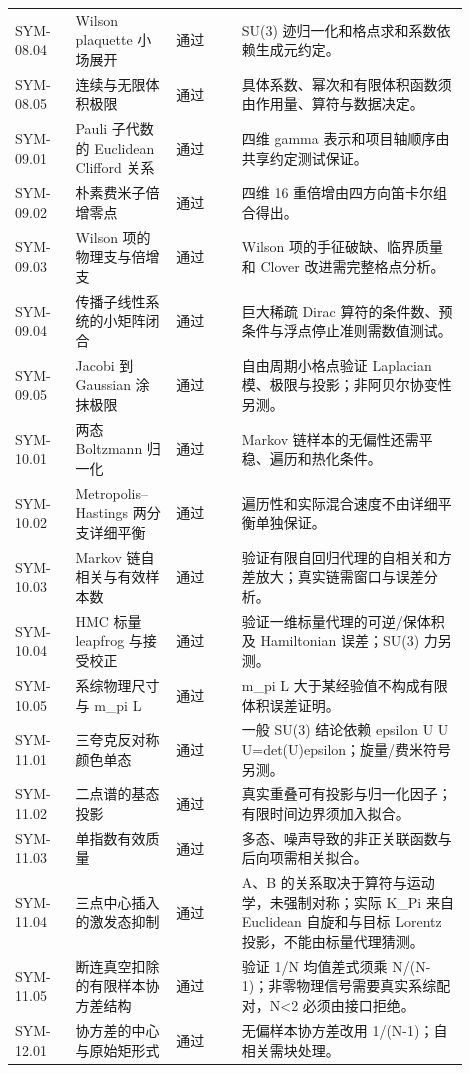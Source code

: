 \begin{longtable}{p{0.12\linewidth}p{0.20\linewidth}p{0.13\linewidth}p{0.45\linewidth}}
SYM-08.04 & Wilson plaquette 小场展开 & 通过 & SU(3) 迹归一化和格点求和系数依赖生成元约定。\\
SYM-08.05 & 连续与无限体积极限 & 通过 & 具体系数、幂次和有限体积函数须由作用量、算符与数据决定。\\
SYM-09.01 & Pauli 子代数的 Euclidean Clifford 关系 & 通过 & 四维 gamma 表示和项目轴顺序由共享约定测试保证。\\
SYM-09.02 & 朴素费米子倍增零点 & 通过 & 四维 16 重倍增由四方向笛卡尔组合得出。\\
SYM-09.03 & Wilson 项的物理支与倍增支 & 通过 & Wilson 项的手征破缺、临界质量和 Clover 改进需完整格点分析。\\
SYM-09.04 & 传播子线性系统的小矩阵闭合 & 通过 & 巨大稀疏 Dirac 算符的条件数、预条件与浮点停止准则需数值测试。\\
SYM-09.05 & Jacobi 到 Gaussian 涂抹极限 & 通过 & 自由周期小格点验证 Laplacian 模、极限与投影；非阿贝尔协变性另测。\\
SYM-10.01 & 两态 Boltzmann 归一化 & 通过 & Markov 链样本的无偏性还需平稳、遍历和热化条件。\\
SYM-10.02 & Metropolis--Hastings 两分支详细平衡 & 通过 & 遍历性和实际混合速度不由详细平衡单独保证。\\
SYM-10.03 & Markov 链自相关与有效样本数 & 通过 & 验证有限自回归代理的自相关和方差放大；真实链需窗口与误差分析。\\
SYM-10.04 & HMC 标量 leapfrog 与接受校正 & 通过 & 验证一维标量代理的可逆/保体积及 Hamiltonian 误差；SU(3) 力另测。\\
SYM-10.05 & 系综物理尺寸与 m\_pi L & 通过 & m\_pi L 大于某经验值不构成有限体积误差证明。\\
SYM-11.01 & 三夸克反对称颜色单态 & 通过 & 一般 SU(3) 结论依赖 epsilon U U U=det(U)epsilon；旋量/费米符号另测。\\
SYM-11.02 & 二点谱的基态投影 & 通过 & 真实重叠可有投影与归一化因子；有限时间边界须加入拟合。\\
SYM-11.03 & 单指数有效质量 & 通过 & 多态、噪声导致的非正关联函数与后向项需相关拟合。\\
SYM-11.04 & 三点中心插入的激发态抑制 & 通过 & A、B 的关系取决于算符与运动学，未强制对称；实际 K\_Pi 来自 Euclidean 自旋和与目标 Lorentz 投影，不能由标量代理猜测。\\
SYM-11.05 & 断连真空扣除的有限样本协方差结构 & 通过 & 验证 1/N 均值差式须乘 N/(N-1)；非零物理信号需要真实系综配对，N<2 必须由接口拒绝。\\
SYM-12.01 & 协方差的中心与原始矩形式 & 通过 & 无偏样本协方差改用 1/(N-1)；自相关需块处理。\\

\end{longtable}
